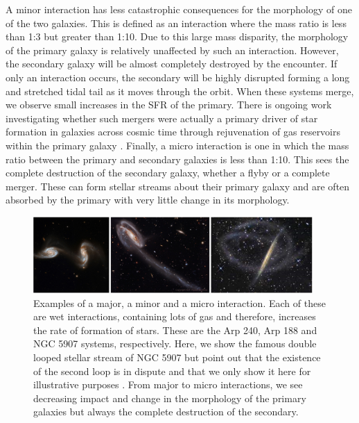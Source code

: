 A minor interaction has less catastrophic consequences for the morphology of one of the two galaxies. This is defined as an interaction where the mass ratio is less than 1:3 but greater than 1:10. Due to this large mass disparity, the morphology of the primary galaxy is relatively unaffected by such an interaction. However, the secondary galaxy will be almost completely destroyed by the encounter. If only an interaction occurs, the secondary will be highly disrupted forming a long and stretched tidal tail as it moves through the orbit. When these systems merge, we observe small increases in the SFR of the primary. There is ongoing work investigating whether such mergers were actually a primary driver of star formation in galaxies across cosmic time through rejuvenation of gas reservoirs within the primary galaxy \citep{2007A&A...476.1179B, 2014MNRAS.440.2944K, 2022MNRAS.511..607J}. Finally, a micro interaction is one in which the mass ratio between the primary and secondary galaxies is less than 1:10. This sees the complete destruction of the secondary galaxy, whether a flyby or a complete merger. These can form stellar streams about their primary galaxy and are often absorbed by the primary with very little change in its morphology.

\begin{figure}
\centering
\includegraphics[width=0.95\textwidth]{Introduction/figures/combined-examples-mergers.jpg}
\caption[Examples of a major, a minor and a micro interaction.]{Examples of a major, a minor and a micro interaction. Each of these are wet interactions, containing lots of gas and therefore, increases the rate of formation of stars. These are the Arp 240, Arp 188 and NGC 5907 systems, respectively. Here, we show the famous double looped stellar stream of NGC 5907 but point out that the existence of the second loop is in dispute and that we only show it here for illustrative purposes \citep{2019ApJ...883L..32V}. From major to micro interactions, we see decreasing impact and change in the morphology of the primary galaxies but always the complete destruction of the secondary.}
\label{fig:merger-clsfs}
\end{figure}

